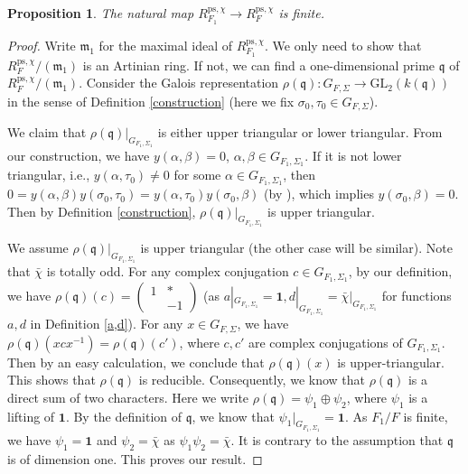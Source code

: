 \documentclass[a4paper, 12pt]{amsart}
\newtheorem{prop}[thm]{Proposition}
\def\ps{\mathrm{ps}}
\newcommand{\GL}{\mathrm{GL}}
\newcommand{\kq}{\mathfrak{q}}
\newcommand{\km}{\mathfrak{m}}
\begin{document}
    \begin{prop}\label{finiteness of ps}
      The natural map $ R_{F_1}^{\ps, \chi} \to R_{F}^{\ps, \chi}$ is finite.
    \end{prop}
	
	\begin{proof}
		Write $ \km_1$ for the maximal ideal of $R_{F_1}^{\ps, \chi}$. We only need to show that $R_{F}^{\ps, \chi}/ (\km_1)$ is an Artinian ring. If not, we can find a one-dimensional prime $\kq$ of $R_F^{\ps, \chi}/ (\km_1)$. Consider the Galois representation $\rho(\kq) : G_{F, \Sigma} \to \GL_2(k(\kq))$ in the sense of Definition \ref{construction} (here we fix $\sigma_0, \tau_0 \in G_{F, \Sigma}$).
		
		  We claim that $\rho(\kq)|_{G_{F_1, \Sigma_1}}$ is either upper triangular or lower triangular. From our construction, we have $y(\alpha, \beta)=0$, $\alpha, \beta \in G_{F_1, \Sigma_1}$. If it is not lower triangular, i.e., $y(\alpha, \tau_0) \ne 0$ for some $\alpha \in G_{F_1, \Sigma_1}$, then $0=y(\alpha, \beta)y(\sigma_0, \tau_0)=y(\alpha, \tau_0)y(\sigma_0, \beta)$ (by \cite[2.1.4]{pan2022fontaine}), which implies $ y(\sigma_0, \beta)=0$. Then by Definition \ref{construction}, $\rho(\kq)|_{G_{F_1, \Sigma_1}}$ is 
		  upper triangular.
		  
		  We assume $\rho(\kq)|_{G_{F_1, \Sigma_1}}$ is upper triangular (the other case will be similar). Note that $\bar{\chi}$ is totally odd. For any complex conjugation $c \in G_{F_1, \Sigma_1}$, by our definition, we have $ \rho(\kq)(c)=\begin{pmatrix}
			1 & *\\
			~& -1
		\end{pmatrix}$ (as $a|_{G_{F_1, \Sigma_1}}=\mathbf{1}, d|_{G_{F_1, \Sigma_1}}=\bar{\chi}|_{G_{F_1, \Sigma_1}}$ for functions $a, d$ in Definition \ref{a,d}). For any $x \in G_{F, \Sigma}$, we have $\rho(\kq)(xcx^{-1}) = \rho(\kq)(c')$, where $c, c'$ are complex conjugations of $G_{F_1, \Sigma_1} $. Then by an easy calculation, we conclude that $\rho(\kq)(x)$ is upper-triangular. This shows that $\rho(\kq) $ is reducible. Consequently, we know that $\rho(\kq)$ is a direct sum of two characters. Here we write $\rho(\kq) = \psi_1 \oplus \psi_{2}$, where $\psi_1$ is a lifting of $\mathbf{1}$. By the definition of $\kq$, we know that $\psi_1|_{G_{F_1, \Sigma_1}}=\mathbf{1}$. As $F_1/F$ is finite, we have $\psi_1=\mathbf{1}$ and $\psi_{2} =\bar{\chi}$ as $ \psi_1\psi_{2}=\bar{\chi}$. It is contrary to the assumption that $\kq$ is of dimension one. This proves our result.
	\end{proof}
	
\end{document}
